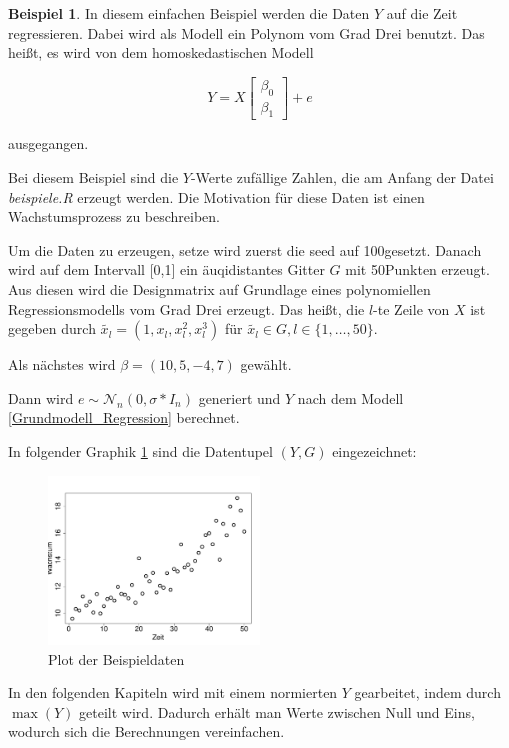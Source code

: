 \documentclass[12pt,a4paper]{article}
\theoremstyle{definition}
\newtheorem{Beispiel}[Definition]{Beispiel}
\theoremstyle{definition}
\theoremstyle{definition}
\theoremstyle{definition}
\newcommand{\seedexample}{100}
\newcommand{\nobs}{50}
\newcommand{\betatrue}{(10,5,-4,7)}
\newcommand{\betaone}[0]{\left[ \begin{array}{c} \beta_{0} \\ \beta_{1} \end{array} \right]}
\begin{document}

\begin{Beispiel}
In diesem einfachen Beispiel werden die Daten $Y$ auf die Zeit regressieren. Dabei wird als Modell ein Polynom vom Grad Drei benutzt. Das heißt, es wird von dem homoskedastischen Modell

\begin{equation*}
Y =  X  \betaone + e 
\end{equation*}

ausgegangen.

Bei diesem Beispiel sind die $Y$-Werte zufällige Zahlen, die am Anfang der Datei \textit{beispiele.R} erzeugt werden. Die Motivation für diese Daten ist einen Wachstumsprozess zu beschreiben.

Um die Daten zu erzeugen, setze wird zuerst die seed auf \seedexample gesetzt. Danach wird  auf dem Intervall [0,1] ein äuqidistantes Gitter $G$ mit \nobs  Punkten erzeugt. Aus diesen wird die Designmatrix auf Grundlage eines polynomiellen Regressionsmodells vom Grad Drei erzeugt. Das heißt, die $l$-te Zeile von $X$ ist gegeben durch $\tilde{x_l} = (1, x_l, x_l^2, x_l^3)$ für $\tilde{x_l} \in G, l \in \{1, \ldots, \nobs\}$.

Als nächstes wird $\beta = \betatrue$ gewählt. 

Dann wird $e \sim \mathscr{N}_{n}(0,\sigma * I_n)$ generiert und  $Y$ nach dem Modell \eqref{Grundmodell_Regression} berechnet.

In folgender Graphik \ref{Beispieldaten} sind die Datentupel $(Y,G)$ eingezeichnet:

\begin{figure}[H] 
  \centering
     \includegraphics[width=0.5\textwidth]{data-raw-R}
  \caption{Plot der Beispieldaten}
  \label{Beispieldaten}
\end{figure}

In den folgenden Kapiteln wird mit einem normierten $Y$ gearbeitet, indem durch $\max(Y)$ geteilt wird. Dadurch erhält man Werte zwischen Null und Eins, wodurch sich die Berechnungen vereinfachen.


\end{Beispiel}
\end{document}
